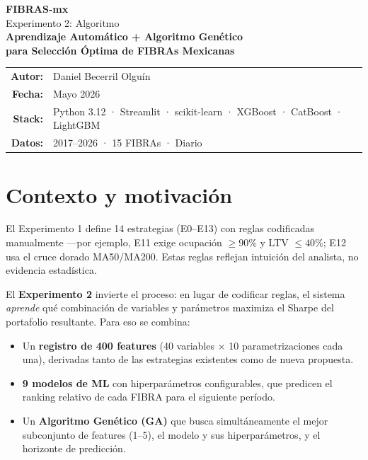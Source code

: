 \documentclass[12pt,letterpaper]{article}
\begin{document}
\begin{titlepage}
  \centering
  \vspace*{3cm}
  {\Huge\bfseries\color{azulFIBRA} FIBRAS-mx\\[0.4em]}
  {\LARGE Experimento 2: Algoritmo}\\[1.5em]
  {\large\bfseries Aprendizaje Automático + Algoritmo Genético\\
  para Selección Óptima de FIBRAs Mexicanas}
  \vfill
  \begin{tabular}{rl}
    \textbf{Autor:}   & Daniel Becerril Olguín \\[0.3em]
    \textbf{Fecha:}   & Mayo 2026 \\[0.3em]
    \textbf{Stack:}   & Python 3.12 · Streamlit · scikit-learn · XGBoost · CatBoost · LightGBM \\[0.3em]
    \textbf{Datos:}   & 2017--2026 · 15 FIBRAs · Diario \\
  \end{tabular}
  \vspace{2cm}
\end{titlepage}

\section{Contexto y motivación}

El Experimento 1 define 14 estrategias (E0--E13) con reglas codificadas manualmente
—por ejemplo, E11 exige ocupación $\geq 90\%$ y LTV $\leq 40\%$; E12 usa el cruce
dorado MA50/MA200. Estas reglas reflejan intuición del analista, no evidencia estadística.

\medskip

El \textbf{Experimento 2} invierte el proceso: en lugar de codificar reglas,
el sistema \emph{aprende} qué combinación de variables y parámetros maximiza el
Sharpe del portafolio resultante. Para eso se combina:

\begin{itemize}[leftmargin=2em]
  \item Un \textbf{registro de 400 features} (40 variables × 10 parametrizaciones
        cada una), derivadas tanto de las estrategias existentes como de nueva
        propuesta.
  \item \textbf{9 modelos de ML} con hiperparámetros configurables, que predicen
        el ranking relativo de cada FIBRA para el siguiente período.
  \item Un \textbf{Algoritmo Genético (GA)} que busca simultáneamente el mejor
        subconjunto de features (1--5), el modelo y sus hiperparámetros, y el
        horizonte de predicción.
\end{itemize}
\end{document}
